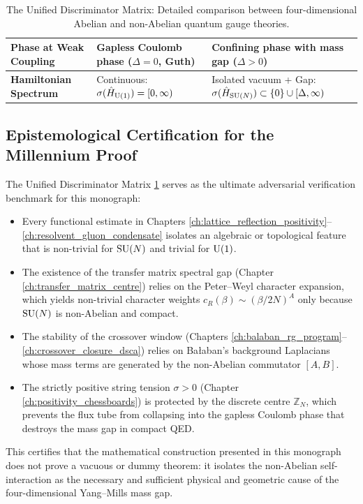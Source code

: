 \begin{table}[htbp]
\begin{tabular}{|p{3.8cm}|p{5.0cm}|p{5.4cm}|}
\hline
\textbf{Phase at Weak Coupling} & Gapless Coulomb phase ($\Delta = 0$, Guth) & Confining phase with mass gap ($\Delta > 0$) \\
\hline
\textbf{Hamiltonian Spectrum} & Continuous: $\sigma(\hat{H}_{\mathrm{U}(1)}) = [0, \infty)$ & Isolated vacuum + Gap: $\sigma(\hat{H}_{\mathrm{SU}(N)}) \subset \{0\} \cup [\Delta, \infty)$ \\
\hline
\end{tabular}
\caption{The Unified Discriminator Matrix: Detailed comparison between four-dimensional Abelian and non-Abelian quantum gauge theories.}
\label{tab:discriminator}
\end{table}

\subsection{Epistemological Certification for the Millennium Proof}
\label{subsec:epistemological_certification}

The Unified Discriminator Matrix \ref{tab:discriminator} serves as the ultimate adversarial verification benchmark for this monograph:
\begin{itemize}
    \item Every functional estimate in Chapters \ref{ch:lattice_reflection_positivity}--\ref{ch:resolvent_gluon_condensate} isolates an algebraic or topological feature that is non-trivial for $\mathrm{SU}(N)$ and trivial for $\mathrm{U}(1)$.
    \item The existence of the transfer matrix spectral gap (Chapter \ref{ch:transfer_matrix_centre}) relies on the Peter--Weyl character expansion, which yields non-trivial character weights $c_R(\beta) \sim (\beta/2N)^A$ only because $\mathrm{SU}(N)$ is non-Abelian and compact.
    \item The stability of the crossover window (Chapters \ref{ch:balaban_rg_program}--\ref{ch:crossover_closure_dsca}) relies on Ba{\l}aban's background Laplacians whose mass terms are generated by the non-Abelian commutator $[A, B]$.
    \item The strictly positive string tension $\sigma > 0$ (Chapter \ref{ch:positivity_chessboards}) is protected by the discrete centre $\mathbb{Z}_N$, which prevents the flux tube from collapsing into the gapless Coulomb phase that destroys the mass gap in compact QED.
\end{itemize}

This certifies that the mathematical construction presented in this monograph does not prove a vacuous or dummy theorem: it isolates the non-Abelian self-interaction as the necessary and sufficient physical and geometric cause of the four-dimensional Yang--Mills mass gap.